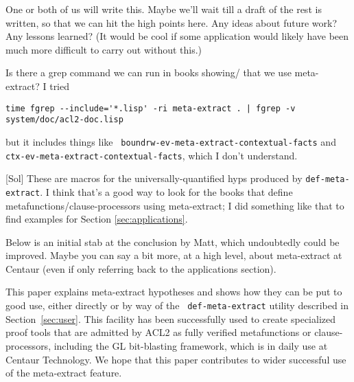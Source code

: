 \begin{mycomment}
 One or both of us will write this.  Maybe we'll wait
  till a draft of the rest is written, so that we can hit the high
  points here.  Any ideas about future work?  Any lessons learned?
  (It would be cool if some application would likely have been much
  more difficult to carry out without this.)
\end{mycomment}

\begin{mycomment}
Is there a grep command we can run in books showing/ that we use
    meta-extract?  I tried

\begin{verbatim}
time fgrep --include='*.lisp' -ri meta-extract . | fgrep -v system/doc/acl2-doc.lisp
\end{verbatim}

\noindent but it includes things like {\tt
boundrw-ev-meta-extract-contextual-facts} and {\tt
ctx-ev-meta-extract-contextual-facts}, which I don't understand.

[Sol] These are macros for the universally-quantified hyps produced by
{\tt def-meta-extract}.  I think that's a good way to look for the
books that define metafunctions/clause-processors using meta-extract;
I did something like that to find examples for Section
\ref{sec:applications}.

Below is an initial stab at the conclusion by Matt, which undoubtedly
could be improved.  Maybe you can say a bit more, at a high level,
    about meta-extract at Centaur (even if only referring back to the
    applications section).
\end{mycomment}

This paper explains meta-extract hypotheses and shows how they can be
put to good use, either directly or by way of the {\tt
  def-meta-extract} utility described in Section~\ref{sec:user}.  This
facility has been successfully used to create specialized proof tools
that are admitted by ACL2 as fully verified metafunctions or
clause-processors, including the GL bit-blasting framework, which is
in daily use at Centaur Technology.  We hope that this paper
contributes to wider successful use of the meta-extract feature.
